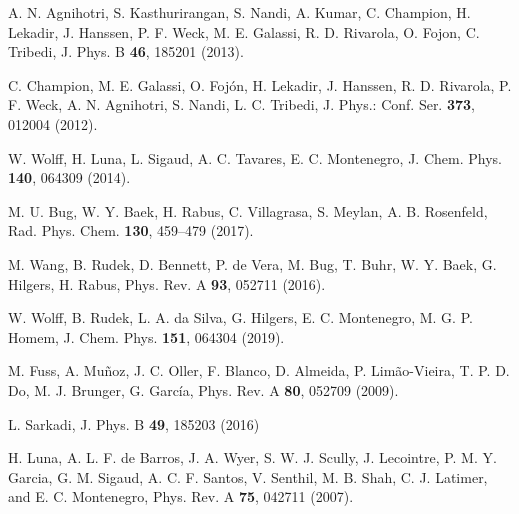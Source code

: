 \begin{thebibliography}{9}
A. N. Agnihotri, S. Kasthurirangan, S. Nandi, A. Kumar, C. Champion, 
H. Lekadir, J. Hanssen, P. F. Weck, M. E. Galassi, R. D. Rivarola, 
O. Fojon, C. Tribedi, 
J. Phys. B \textbf{46}, 185201 (2013).

C. Champion, M. E. Galassi, O. Foj\'{o}n, H. Lekadir, J. Hanssen, 
R. D. Rivarola, P. F. Weck, A. N. Agnihotri, S. Nandi, L. C. Tribedi,
J. Phys.: Conf. Ser. \textbf{373}, 012004 (2012).

W. Wolff, H. Luna, L. Sigaud, A. C. Tavares, E. C. Montenegro,
J. Chem. Phys. \textbf{140}, 064309 (2014).

M. U. Bug, W. Y. Baek, H. Rabus, C. Villagrasa, S. Meylan, A. B. Rosenfeld,
Rad. Phys. Chem. \textbf{130}, 459--479 (2017).

M. Wang, B. Rudek, D. Bennett, P. de Vera, M. Bug, T. Buhr, W. Y. Baek, 
G. Hilgers, H. Rabus, 
Phys. Rev. A \textbf{93}, 052711 (2016).

W. Wolff, B. Rudek, L. A. da Silva, G. Hilgers, E. C. Montenegro, 
M. G. P. Homem,
J. Chem. Phys. \textbf{151}, 064304 (2019).

M. Fuss, A. Muñoz, J. C. Oller, F. Blanco, D. Almeida, P. Limão-Vieira, 
T. P. D. Do, M. J. Brunger, G. Garc\'{i}a,
Phys. Rev. A \textbf{80}, 052709 (2009).

L. Sarkadi, 
J. Phys. B \textbf{49}, 185203 (2016)

H. Luna, A. L. F. de Barros, J. A. Wyer, S. W. J. Scully, J. Lecointre, 
P. M. Y. Garcia, G. M. Sigaud, A. C. F. Santos, V. Senthil, M. B. Shah, 
C. J. Latimer, and E. C. Montenegro,
Phys. Rev. A \textbf{75}, 042711 (2007).


\end{thebibliography}
